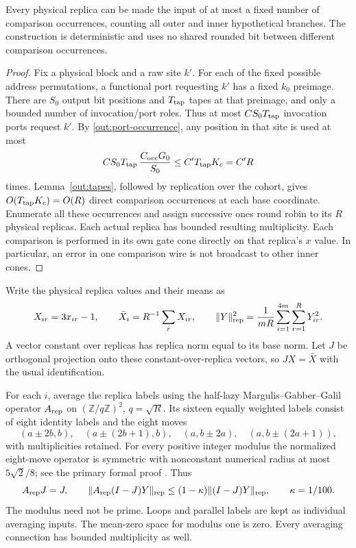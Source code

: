 \begin{lemma}\label{out:routing}
Every physical replica can be made the input of at most a fixed number
of comparison occurrences, counting all outer and inner hypothetical
branches. The construction is deterministic and uses no shared rounded
bit between different comparison occurrences.
\end{lemma}
\begin{proof}
Fix a physical block and a raw site $k'$. For each of the fixed possible
address permutations, a functional port requesting $k'$ has a fixed
$k_0$ preimage. There are $S_0$ output bit positions and $T_{\rm tap}$
tapes at that preimage, and only a bounded number of invocation/port
roles. Thus at most $C S_0T_{\rm tap}$ invocation ports request $k'$.
By \eqref{out:port-occurrence}, any position in that site is used at most
\begin{equation}\label{out:gadget-load}
 C S_0T_{\rm tap}\,\frac{C_{\rm occ}G_0}{S_0}
       \leq C' T_{\rm tap}K_c=C'R
\end{equation}
times. Lemma~\ref{out:tapes}, followed by replication over the cohort,
gives $O(T_{\rm tap}K_c)=O(R)$ direct comparison occurrences at each
base coordinate. Enumerate all these occurrences and assign successive
ones round robin to its $R$ physical replicas. Each actual replica has
bounded resulting multiplicity. Each comparison is performed in its
own gate cone directly on that replica's $x$ value. In particular, an
error in one comparison wire is not broadcast to other inner cones.
\end{proof}

Write the physical replica values and their means as
\[
 X_{ir}=3x_{ir}-1,\qquad \bar X_i=R^{-1}\sum_rX_{ir},\qquad
 \lVert Y\rVert_{\rm rep}^2=\frac1{mR}\sum_{i=1}^{4m}\sum_{r=1}^R Y_{ir}^2.
\]
A vector constant over replicas has replica norm equal to its base norm.
Let $J$ be orthogonal projection onto these constant-over-replica
vectors, so $JX=\bar X$ with the usual identification.

For each $i$, average the replica labels using the half-lazy
Margulis--Gabber--Galil operator $A_{\rm rep}$ on
$(\mathbb Z/q\mathbb Z)^2$, $q=\sqrt R$. Its sixteen equally weighted
labels consist of eight identity labels and the eight moves
\[
 (a\pm2b,b),\quad(a\pm(2b+1),b),\quad
 (a,b\pm2a),\quad(a,b\pm(2a+1)),
\]
with multiplicities retained. For every positive integer modulus the
normalized eight-move operator is symmetric with nonconstant numerical
radius at most $5\sqrt2/8$; see the primary formal proof
\cite[\texttt{mgg\_numerical\_radius}]{MGGAFP}. Thus
\begin{equation}\label{out:replica-gap}
 A_{\rm rep}J=J,\qquad
 \lVert A_{\rm rep}(I-J)Y\rVert_{\rm rep}
       \leq(1-\kappa)\lVert (I-J)Y\rVert_{\rm rep},
 \qquad \kappa=1/100.
\end{equation}
The modulus need not be prime. Loops and parallel labels are kept as
individual averaging inputs. The mean-zero space for modulus one is
zero. Every averaging connection has bounded multiplicity as well.

